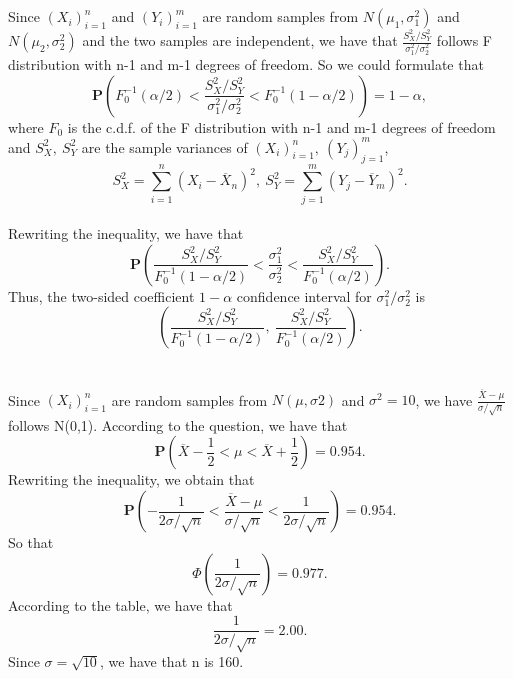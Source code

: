 \documentclass[10.5pt]{article}
\begin{document}
\section{}
Since $(X_i)_{i=1}^n$ and $(Y_i)_{i=1}^m$ are random samples from $N(\mu_1,\sigma_1^2)$ and $N(\mu_2,\sigma_2^2)$ and the two samples are independent, we have that $\frac{S_X^2/S_Y^2}{\sigma_1^2/\sigma_2^2}$ follows F distribution with n-1 and m-1 degrees of freedom. So we could formulate that $$\mathbf{P}\left(F_0^{-1}(\alpha/2)<\frac{S_X^2/S_Y^2}{\sigma_1^2/\sigma_2^2}<F_0^{-1}(1-\alpha/2)\right)=1-\alpha,$$\indent
where $F_0$ is the c.d.f. of the F distribution with n-1 and m-1 degrees of freedom and $S_X^2,~S_Y^2$ are the sample variances of $(X_i)_{i=1}^n,~(Y_j)_{j=1}^m$,$$S_X^2=\sum_{i=1}^n(X_i-\overline{X}_n)^2,~S_Y^2=\sum_{j=1}^m(Y_j-\overline{Y}_m)^2.$$\\\indent
Rewriting the inequality, we have that $$\mathbf{P}\left(\frac{S_X^2/S_Y^2}{F_0^{-1}(1-\alpha/2)}<\frac{\sigma_1^2}{\sigma_2^2}<\frac{S_X^2/S_Y^2}{F_0^{-1}(\alpha/2)}\right).$$\indent
Thus, the two-sided coefficient $1-\alpha$ confidence interval for $\sigma_1^2/\sigma_2^2$ is $$\left(\frac{S_X^2/S_Y^2}{F_0^{-1}(1-\alpha/2)},~\frac{S_X^2/S_Y^2}{F_0^{-1}(\alpha/2)}\right).$$

\section{}
Since $(X_i)_{i=1}^n$ are random samples from $N(\mu,\sigma2)$ and $\sigma^2=10$, we have $\frac{\overline{X}-\mu}{\sigma/\sqrt{n}}$ follows N(0,1). According to the question, we have that $$\mathbf{P}\left(\overline{X}-\frac{1}{2}<\mu<\overline{X}+\frac{1}{2}\right)=0.954.$$\indent
Rewriting the inequality, we obtain that $$\mathbf{P}\left(-\frac{1}{2\sigma/\sqrt{n}}<\frac{\overline{X}-\mu}{\sigma/\sqrt{n}}<\frac{1}{2\sigma/\sqrt{n}}\right)=0.954.$$\indent
So that $$\Phi(\frac{1}{2\sigma/\sqrt{n}})=0.977.$$\indent
According to the table, we have that $$\frac{1}{2\sigma/\sqrt{n}}=2.00.$$\indent
Since $\sigma=\sqrt{10}$, we have that n is 160.
\end{document}
